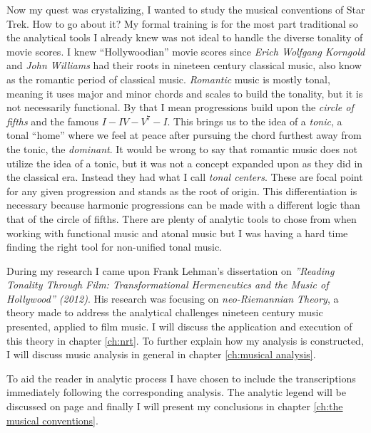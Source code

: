 Now my quest was crystalizing, I wanted to study the musical conventions of Star Trek. How to go about it? My formal training is for the most part traditional so the analytical tools I already knew was not ideal to handle the diverse tonality of movie scores. I knew ``Hollywoodian'' movie scores since \textit{Erich Wolfgang Korngold} and \textit{John Williams} had their roots in nineteen century classical music, also know as the romantic period of classical music. \textit{Romantic} music is mostly tonal, meaning it uses major and minor chords and scales to build the tonality, but it is not necessarily functional. By that I mean progressions build upon the \textit{circle of fifths} and the famous \(I-IV-V^{7}-I\). This brings us to the idea of a \textit{tonic}, a tonal ``home'' where we feel at peace after pursuing the chord furthest away from the tonic, the \textit{dominant}. It would be wrong to say that romantic music does not utilize the idea of a tonic, but it was not a concept expanded upon as they did in the classical era. Instead they had what I call \textit{tonal centers}. These are focal point for any given progression and stands as the root of origin. This differentiation is necessary because harmonic progressions can be made with a different logic than that of the circle of fifths. There are plenty of analytic tools to chose from when working with functional music and atonal music but I was having a hard time finding the right tool for non-unified tonal music.

During my research I came upon Frank Lehman's dissertation on \textit{''Reading Tonality Through Film: Transformational Hermeneutics and the Music of Hollywood'' (2012)}. His research was focusing on \textit{neo-Riemannian Theory}, a theory made to address the analytical challenges nineteen century music presented, applied to film music. I will discuss the application and execution of this theory in chapter \ref{ch:nrt}. To further explain how my analysis is constructed, I will discuss music analysis in general in chapter \ref{ch:musical analysis}. 

To aid the reader in analytic process I have chosen to include the transcriptions immediately following the corresponding analysis. The analytic legend will be discussed on page \pageref{fg:analysis legend} and finally I will present my conclusions in chapter \ref{ch:the musical conventions}.

